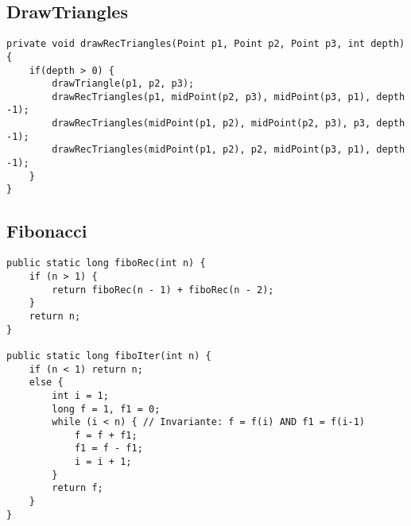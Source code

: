 \subsection*{DrawTriangles}

\begin{verbatim}    
private void drawRecTriangles(Point p1, Point p2, Point p3, int depth) {
  	if(depth > 0) {
  		drawTriangle(p1, p2, p3);
  		drawRecTriangles(p1, midPoint(p2, p3), midPoint(p3, p1), depth -1);
  		drawRecTriangles(midPoint(p1, p2), midPoint(p2, p3), p3, depth -1);
  		drawRecTriangles(midPoint(p1, p2), p2, midPoint(p3, p1), depth -1);
  	}
}
\end{verbatim}

\subsection*{Fibonacci}

\begin{verbatim} 
public static long fiboRec(int n) {
    if (n > 1) {
        return fiboRec(n - 1) + fiboRec(n - 2);
    }
    return n;
}

public static long fiboIter(int n) {
    if (n < 1) return n;
    else {
        int i = 1;
        long f = 1, f1 = 0; 
        while (i < n) { // Invariante: f = f(i) AND f1 = f(i-1)
            f = f + f1;
            f1 = f - f1;
            i = i + 1;
        }
        return f;
    }
}
\end{verbatim}